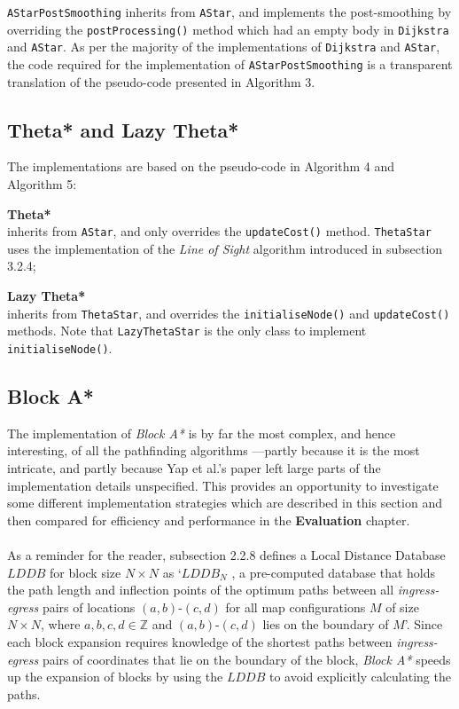 \documentclass[12pt,notitlepage]{report}
\begin{document}
{\tt AStarPostSmoothing} inherits from {\tt AStar}, and implements the post-smoothing by overriding the {\tt postProcessing()} method which had an empty body in {\tt Dijkstra} and {\tt AStar}. As per the majority of the implementations of {\tt Dijkstra} and {\tt AStar}, the code required for the implementation of {\tt AStarPostSmoothing} is a transparent translation of the pseudo-code presented in Algorithm 3.\\

\subsection {Theta* and Lazy Theta*}

The implementations are based on the pseudo-code in Algorithm 4 and Algorithm 5: 
\begin{description}
\item{\bfseries Theta*}\\ \hfill inherits from {\tt AStar}, and only overrides the {\tt updateCost()} method. {\tt ThetaStar} uses the implementation of the {\em Line of Sight} algorithm introduced in subsection 3.2.4;
\item {\bfseries Lazy Theta*}\\ \hfill inherits from {\tt ThetaStar}, and overrides the {\tt initialiseNode()} and {\tt updateCost()} methods. Note that {\tt LazyThetaStar} is the only class to implement {\tt initialiseNode()}.
\end{description}

\subsection {Block A*}
The implementation of {\em Block A*} is by far the most complex, and hence interesting, of all the pathfinding algorithms ---partly because it is the most intricate, and partly because Yap et al.'s paper left large parts of the implementation details unspecified. This provides an opportunity to investigate some different implementation strategies which are described in this section and then compared for efficiency and performance in the {\bfseries Evaluation} chapter.\\

\\
\noindent
As a reminder for the reader, subsection 2.2.8 defines a Local Distance Database $LDDB$ for block size $N \times N$ as `$LDDB_{N}$ , a pre-computed database that holds the path length and inflection points of the optimum paths between all {\em ingress-egress} pairs of locations $(a,b)$-$(c,d)$ for all map configurations $M$ of size $N \times N$, where $a,b,c,d \in \mathbb{Z}$ and $(a,b)$-$(c,d)$ lies on the boundary of $M$'. Since each block expansion requires knowledge of the shortest paths between {\em ingress-egress} pairs of coordinates that lie on the boundary of the block, {\em Block A*} speeds up the expansion of blocks by using the $LDDB$ to avoid explicitly calculating the paths.\\
\end{document}
